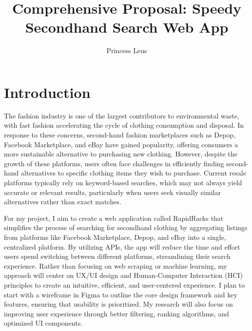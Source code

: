 \documentclass[10pt,twocolumn]{article}
\title{Comprehensive Proposal: Speedy Secondhand Search Web App}
\author{Princess Leus}
\affiliation{Occidental College}
\begin{document}
\maketitle
\section{Introduction}
The fashion industry is one of the largest contributors to environmental waste, with fast fashion accelerating the cycle of clothing consumption and disposal. In response to these concerns, second-hand fashion marketplaces such as Depop, Facebook Marketplace, and eBay have gained popularity, offering consumers a more sustainable alternative to purchasing new clothing. However, despite the growth of these platforms, users often face challenges in efficiently finding second-hand alternatives to specific clothing items they wish to purchase. Current resale platforms typically rely on keyword-based searches, which may not always yield accurate or relevant results, particularly when users seek visually similar alternatives rather than exact matches. 

For my project, I aim to create a web application called RapidRacks that simplifies the process of searching for secondhand clothing by aggregating listings from platforms like Facebook Marketplace, Depop, and eBay into a single, centralized platform. By utilizing APIs, the app will reduce the time and effort users spend switching between different platforms, streamlining their search experience. Rather than focusing on web scraping or machine learning, my approach will center on UX/UI design and Human-Computer Interaction (HCI) principles to create an intuitive, efficient, and user-centered experience. I plan to start with a wireframe in Figma to outline the core design framework and key features, ensuring that usability is prioritized. My research will also focus on improving user experience through better filtering, ranking algorithms, and optimized UI components.
\end{document}
